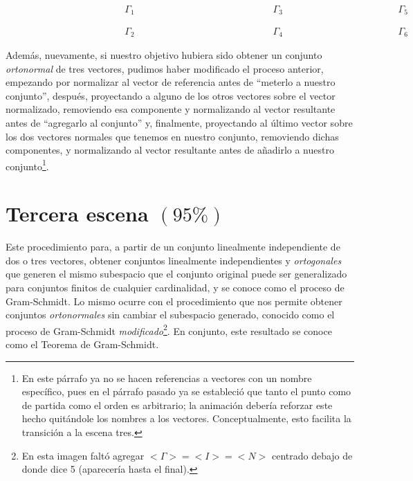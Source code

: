 \documentclass[12pt,dvipsnames]{article}
\numberwithin{equation}{section}
\begin{document}
\begin{align*}
    \hspace{5cm}\Gamma_1 \hspace{6cm}\Gamma_3 \hspace{5cm}\Gamma_5 \\
    \\
    \\
    \hspace{5cm}\Gamma_2 \hspace{6cm}\Gamma_4 \hspace{5cm}\Gamma_6
\end{align*}

Además, nuevamente, si nuestro objetivo hubiera sido obtener un conjunto \emph{ortonormal} de tres vectores, pudimos haber modificado el proceso anterior, empezando por normalizar al vector de referencia antes de ``meterlo a nuestro conjunto'', después, proyectando a alguno de los otros vectores sobre el vector normalizado, removiendo esa componente y normalizando al vector resultante antes de ``agregarlo al conjunto'' y, finalmente, proyectando al último vector sobre los dos vectores normales que tenemos en nuestro conjunto, removiendo dichas componentes, y normalizando al vector resultante antes de añadirlo a nuestro conjunto\footnote{En este párrafo ya no se hacen referencias a vectores con un nombre específico, pues en el párrafo pasado ya se estableció que tanto el punto como de partida como el orden es arbitrario; la animación debería reforzar este hecho quitándole los nombres a los vectores. Conceptualmente, esto facilita la transición a la escena tres.}.


\newpage
\section{Tercera escena $(95\%)$}

Este procedimiento para, a partir de un conjunto linealmente independiente de dos o tres vectores, obtener conjuntos linealmente independientes y \emph{ortogonales} que generen el mismo subespacio que el conjunto original puede ser generalizado para conjuntos finitos de cualquier cardinalidad, y se conoce como el proceso de Gram-Schmidt. Lo mismo ocurre con el procedimiento que nos permite obtener conjuntos \emph{ortonormales} sin cambiar el subespacio generado, conocido como el proceso de Gram-Schmidt \emph{modificado}\footnote{En esta imagen faltó agregar $<\Gamma>=<I>=<N>$ centrado debajo de donde dice 5 (aparecería hasta el final).}. En conjunto, este resultado se conoce como el Teorema de Gram-Schmidt.
\end{document}
